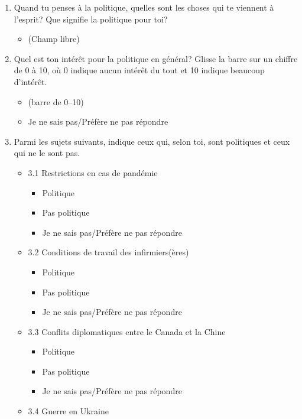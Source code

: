 \documentclass[
  letterpaper,
  DIV=11,
  numbers=noendperiod]{scrreprt}
\providecommand{\tightlist}{%
  \setlength{\itemsep}{0pt}\setlength{\parskip}{0pt}}\usepackage{longtable,booktabs,array}
\begin{document}
\begin{enumerate}
\def\labelenumi{\arabic{enumi}.}
\item
  Quand tu penses à la politique, quelles sont les choses qui te
  viennent à l'esprit? Que signifie la politique pour toi?

  \begin{itemize}
  \tightlist
  \item
    (Champ libre)
  \end{itemize}
\item
  Quel est ton intérêt pour la politique en général? Glisse la barre sur
  un chiffre de 0 à 10, où 0 indique aucun intérêt du tout et 10 indique
  beaucoup d'intérêt.

  \begin{itemize}
  \tightlist
  \item
    (barre de 0--10)
  \item
    Je ne sais pas/Préfère ne pas répondre
  \end{itemize}
\item
  Parmi les sujets suivants, indique ceux qui, selon toi, sont
  politiques et ceux qui ne le sont pas.

  \begin{itemize}
  \tightlist
  \item
    3.1 Restrictions en cas de pandémie

    \begin{itemize}
    \tightlist
    \item
      Politique
    \item
      Pas politique
    \item
      Je ne sais pas/Préfère ne pas répondre
    \end{itemize}
  \item
    3.2 Conditions de travail des infirmiers(ères)

    \begin{itemize}
    \tightlist
    \item
      Politique
    \item
      Pas politique
    \item
      Je ne sais pas/Préfère ne pas répondre
    \end{itemize}
  \item
    3.3 Conflits diplomatiques entre le Canada et la Chine

    \begin{itemize}
    \tightlist
    \item
      Politique
    \item
      Pas politique
    \item
      Je ne sais pas/Préfère ne pas répondre
    \end{itemize}
  \item
    3.4 Guerre en Ukraine


\end{itemize}
\end{enumerate}
\end{document}
